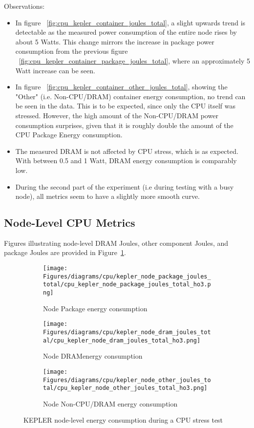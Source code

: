 Observations:
\begin{itemize}
\item In figure ~\ref{fig:cpu_kepler_container_joules_total}, a slight upwards trend is detectable as the measured power consumption of the entire node rises by about 5 Watts. This change mirrors the increase in package power consumption from the previous figure ~\ref{fig:cpu_kepler_container_package_joules_total}, where an approximately 5 Watt increase can be seen.
\item In figure ~\ref{fig:cpu_kepler_container_other_joules_total}, showing the "Other" (i.e. Non-CPU/DRAM) container energy consumption, no trend can be seen in the data. This is to be expected, since only the CPU itself was stressed. However, the high amount of the Non-CPU/DRAM power consumption surprises, given that it is roughly double the amount of the CPU Package Energy consumption.
\item The measured DRAM is not affected by CPU stress, which is as expected. With between 0.5 and 1 Watt, DRAM energy consumption is comparably low.
\item During the second part of the experiment (i.e during testing with a busy node), all metrics seem to have a slightly more smooth curve.
\end{itemize}

\subsection{Node-Level CPU Metrics}

Figures illustrating node-level DRAM Joules, other component Joules, and package Joules are provided in Figure~\ref{fig:cpu_kepler_node_package_joules_total}.

\begin{figure}[H]
    \centering
    \begin{subfigure}{1\textwidth}
        \texttt{[image: Figures/diagrams/cpu/kepler\_node\_package\_joules\_total/cpu\_kepler\_node\_package\_joules\_total\_ho3.png]}
        \caption{Node Package energy consumption}
        \label{fig:cpu_kepler_node_package_joules_total}
    \end{subfigure}
    \begin{subfigure}{0.49\textwidth}
        \texttt{[image: Figures/diagrams/cpu/kepler\_node\_dram\_joules\_total/cpu\_kepler\_node\_dram\_joules\_total\_ho3.png]}
        \caption{Node DRAMenergy consumption}
        \label{fig:cpu_kepler_node_dram_joules_total}
    \end{subfigure}
    \begin{subfigure}{0.49\textwidth}
        \texttt{[image: Figures/diagrams/cpu/kepler\_node\_other\_joules\_total/cpu\_kepler\_node\_other\_joules\_total\_ho3.png]}
        \caption{Node Non-CPU/DRAM energy consumption}
        \label{fig:cpu_kepler_node_other_joules_total}
    \end{subfigure}
    \caption[Node-Level Energy Consumption]{KEPLER node-level energy consumption during a CPU stress test}
\end{figure}


